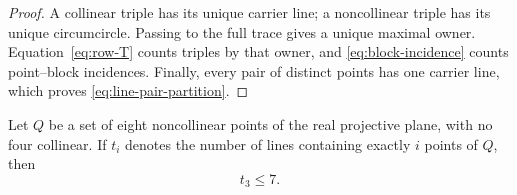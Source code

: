 \begin{proof}
A collinear triple has its unique carrier line; a noncollinear triple has its
unique circumcircle.  Passing to the full trace gives a unique maximal owner.
Equation~\eqref{eq:row-T} counts triples by that owner, and
\eqref{eq:block-incidence} counts point--block incidences.  Finally, every
pair of distinct points has one carrier line, which proves
\eqref{eq:line-pair-partition}.
\end{proof}

\begin{lemma}\label{lem:orchard-eight}
Let \(Q\) be a set of eight noncollinear points of the real projective plane,
with no four collinear.  If \(t_i\) denotes the number of lines containing
exactly \(i\) points of \(Q\), then
\[
 t_3\leq 7.
\]
\end{lemma}


